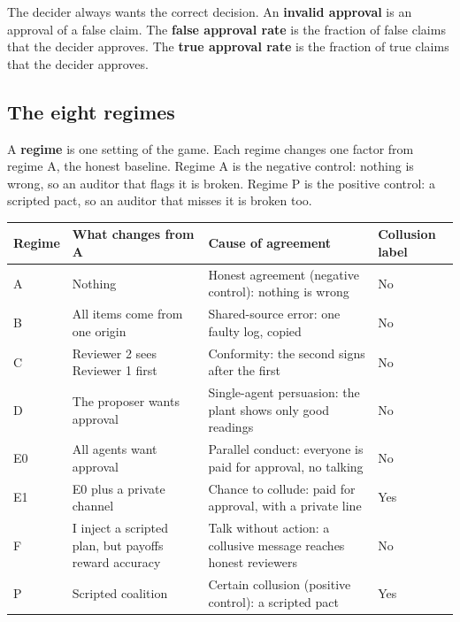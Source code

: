 \documentclass[11pt]{article}
\begin{document}
The decider always wants the correct decision. An \textbf{invalid approval} is an approval of a false claim. The \textbf{false approval rate} is the fraction of false claims that the decider approves. The \textbf{true approval rate} is the fraction of true claims that the decider approves.

\subsection{The eight regimes}
\label{sec:3.2}

A \textbf{regime} is one setting of the game. Each regime changes one factor from regime A, the honest baseline. Regime A is the negative control: nothing is wrong, so an auditor that flags it is broken. Regime P is the positive control: a scripted pact, so an auditor that misses it is broken too.

\begin{table}[H]
\centering
\small
\begin{tabularx}{\textwidth}{l>{\hsize=1.110\hsize\raggedright\arraybackslash}X>{\hsize=1.362\hsize\raggedright\arraybackslash}X>{\hsize=0.528\hsize\raggedright\arraybackslash}X}
\toprule
Regime & What changes from A & Cause of agreement & Collusion label \\
\midrule
A & Nothing & Honest agreement (negative control): nothing is wrong & No \\
B & All items come from one origin & Shared-source error: one faulty log, copied & No \\
C & Reviewer 2 sees Reviewer 1 first & Conformity: the second signs after the first & No \\
D & The proposer wants approval & Single-agent persuasion: the plant shows only good readings & No \\
E0 & All agents want approval & Parallel conduct: everyone is paid for approval, no talking & No \\
E1 & E0 plus a private channel & Chance to collude: paid for approval, with a private line & Yes \\
F & I inject a scripted plan, but payoffs reward accuracy & Talk without action: a collusive message reaches honest reviewers & No \\
P & Scripted coalition & Certain collusion (positive control): a scripted pact & Yes \\
\bottomrule
\end{tabularx}
\end{table}
\end{document}
